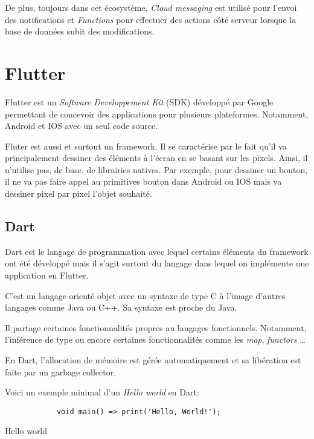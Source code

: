 De plus, toujours dans cet écosystème, \textit{Cloud messaging} est utilisé pour l'envoi des notifications et \textit{Functions} pour
effectuer des actions côté serveur lorsque la base de données subit des modifications.

\section{Flutter}
Flutter est un \textit{Software Developpement Kit} (SDK) développé par Google permettant de concevoir
des applications pour plusieurs plateformes. Notamment, Android et IOS avec un seul code source.

Fluter est aussi et surtout un framework. Il se caractérise par le fait qu'il va principalement dessiner des éléments
à l'écran en se basant sur les pixels. Ainsi, il n'utilise pas, de base, de librairies natives. Par exemple, pour dessiner un
bouton, il ne va pas faire appel au primitives bouton dans Android ou IOS mais va dessiner pixel par pixel
l'objet souhaité.

\subsection{Dart}
Dart est le langage de programmation avec lequel certains éléments du framework ont été développé mais il s'agit
surtout du langage dans lequel on implémente une application en Flutter.

C'est un langage orienté objet avec un syntaxe de type C à l'image d'autres langages comme Java ou C++.
Sa syntaxe est proche du Java.

Il partage certaines fonctionnalités propres au langages fonctionnels. Notamment, l'inférence de type ou encore
certaines fonctionnalités comme les \textit{map}, \textit{functors} \dots

En Dart, l'allocation de mémoire est gérée automatiquement et sa libération est faite par un garbage collector.

Voici un exemple minimal d'un \textit{Hello world} en Dart:
\begin{listing}[!h]
    \begin{verbatim}
            void main() => print('Hello, World!');
        \end{verbatim}
    \label{code:helloWorld}
    \caption{Hello world}
\end{listing}
\newpage

